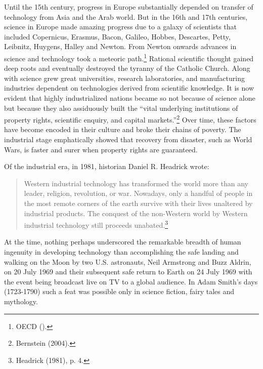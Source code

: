 \begin{multicols}{2}
Until the 15th century, progress in Europe substantially depended on transfer of technology from Asia and the Arab world. But in the 16th and 17th centuries, science in Europe made amazing progress due to a galaxy of scientists that included Copernicus, Erasmus, Bacon, Galileo, Hobbes, Descartes, Petty, Leibnitz, Huygens, Halley and Newton. From Newton onwards advances in science and technology took a meteoric path.\footnote{OECD ().} Rational scientific thought gained deep roots and eventually destroyed the tyranny of the Catholic Church. Along with science grew great universities, research laboratories, and manufacturing industries dependent on technologies derived from scientific knowledge. It is now evident that highly industrialized nations became so not because of science alone but because they also assiduously built the “vital underlying institutions of property rights, scientific enquiry, and capital markets.”\footnote{Bernstein (2004).} Over time, these factors have become encoded in their culture and broke their chains of poverty. The industrial stage emphatically showed that recovery from disaster, such as World Wars, is faster and surer when property rights are guaranteed.

Of the industrial era, in 1981, historian Daniel R. Headrick wrote:
\begin{quote}
Western industrial technology has transformed the world more than any leader, religion, revolution, or war. Nowadays, only a handful of people in the most remote corners of the earth survive with their lives unaltered by industrial products. The conquest of the non-Western world by Western industrial technology still proceeds unabated.\footnote{Headrick (1981), p. 4.}
\end{quote}

At the time, nothing perhaps underscored the remarkable breadth of human ingenuity in developing technology than accomplishing the safe landing and walking on the Moon by two U.S. astronauts, Neil Armstrong and Buzz Aldrin, on 20 July 1969 and their subsequent safe return to Earth on 24 July 1969 with the event being broadcast live on TV to a global audience. In Adam Smith's days (1723-1790) such a feat was possible only in science fiction, fairy tales and mythology.


\end{multicols}

